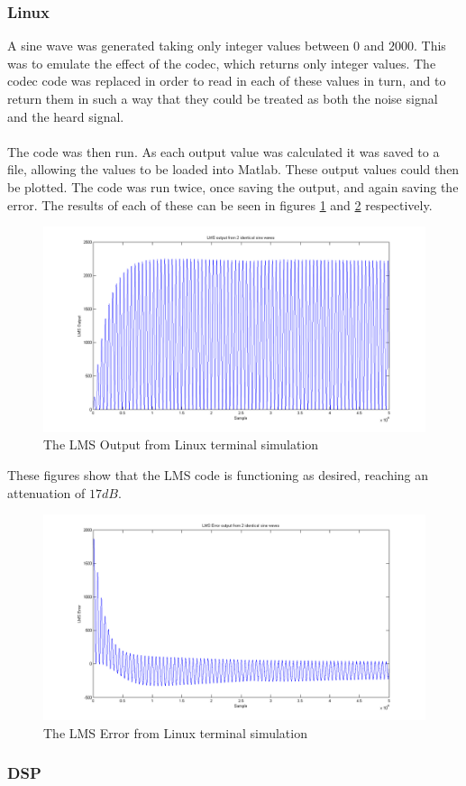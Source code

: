 \subsubsection{Linux}
A sine wave was generated taking only integer values between $0$ and $2000$.
This was to emulate the effect of the codec, which returns only integer values.
The codec code was replaced in order to read in each of these values in turn, and to return them in such a way that they could be treated as both the noise signal and the heard signal.
\\
\\
The code was then run.
As each output value was calculated it was saved to a file, allowing the values to be loaded into Matlab.
These output values could then be plotted.
The code was run twice, once saving the output, and again saving the error.
The results of each of these can be seen in figures \ref{fig:testlmslinuxout} and \ref{fig:testlmslinuxerr} respectively.

\begin{figure}[H]
	\centering
	\includegraphics[width=\textwidth]{./img/lms_linux_out.png}
	\caption{The LMS Output from Linux terminal simulation}
	\label{fig:testlmslinuxout}
\end{figure}

\noindent These figures show that the LMS code is functioning as desired, reaching an attenuation of $17dB$.

\begin{figure}[H]
	\centering
	\includegraphics[width=\textwidth]{./img/lms_linux_err.png}
	\caption{The LMS Error from Linux terminal simulation}
	\label{fig:testlmslinuxerr}
\end{figure}

\subsubsection{DSP}

